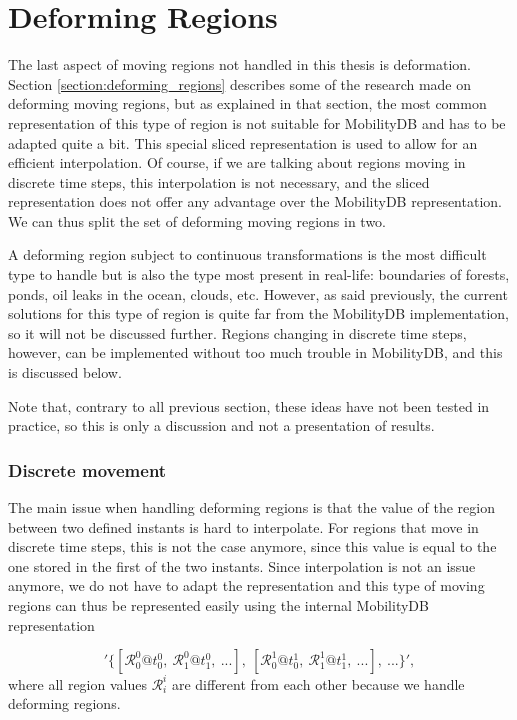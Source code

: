 
\section{Deforming Regions}
\label{section:deforming}

The last aspect of moving regions not handled in this thesis is deformation. Section \ref{section:deforming_regions} describes some of the research made on deforming moving regions, but as explained in that section, the most common representation of this type of region is not suitable for MobilityDB and has to be adapted quite a bit. This special sliced representation is used to allow for an efficient interpolation. Of course, if we are talking about regions moving in discrete time steps, this interpolation is not necessary, and the sliced representation does not offer any advantage over the MobilityDB representation. We can thus split the set of deforming moving regions in two.

A deforming region subject to continuous transformations is the most difficult type to handle but is also the type most present in real-life: boundaries of forests, ponds, oil leaks in the ocean, clouds, etc. However, as said previously, the current solutions for this type of region is quite far from the MobilityDB implementation, so it will not be discussed further. Regions changing in discrete time steps, however, can be implemented without too much trouble in MobilityDB, and this is discussed below.

Note that, contrary to all previous section, these ideas have not been tested in practice, so this is only a discussion and not a presentation of results.

\subsubsection{Discrete movement}

The main issue when handling deforming regions is that the value of the region between two defined instants is hard to interpolate. For regions that move in discrete time steps, this is not the case anymore, since this value is equal to the one stored in the first of the two instants. Since interpolation is not an issue anymore, we do not have to adapt the representation and this type of moving regions can thus be represented easily using the internal MobilityDB representation

\[
    '\{[\mathcal{R}_0^0@t_0^0,\ \mathcal{R}_1^0@t_1^0,\ ...],\ [\mathcal{R}_0^1@t_0^1,\ \mathcal{R}_1^1@t_1^1,\ ...],\ ...\}', 
\]
where all region values $\mathcal{R}_i^i$ are different from each other because we handle deforming regions.


